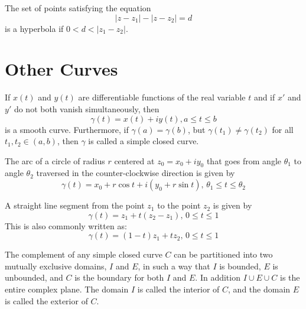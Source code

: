 \documentclass[handout]{ximera}
\begin{document}
\begin{example}[example 7]
The set of points satisfying the equation
\[
|z-z_1| - |z-z_2| = d
\]
is a hyperbola if $0 < d < |z_1 -z_2|$.
\end{example}



\section{Other Curves}


If $x(t)$ and $y(t)$ are differentiable functions of the real variable $t$ and if $x'$ and $y'$ do not both vanish simultaneously,
then
\[
\gamma(t)= x(t) + iy(t),  a \leq t \leq b
\]
is a smooth curve. Furthermore, if $\gamma(a) =\gamma(b)$, but $\gamma(t_1) \neq \gamma(t_2)$ for all $t_1,t_2 \in (a,b)$,
then $\gamma$ is called a simple closed curve.


\begin{example}[example 8]
The arc of a circle of radius $r$ centered at $z_0 = x_0 + iy_0$ that goes from angle $\theta_1$ to angle $\theta_2$ traversed in the counter-clockwise 
direction is given by
\[
\gamma(t) = x_0 + r\cos t + i(y_0 + r\sin t), \, \theta_1 \leq t \leq \theta_2
\]
\end{example}

\begin{example}[example 9]
A straight line segment from the point $z_1$ to the point $z_2$ is given by
\[
\gamma(t) = z_1 + t(z_2-z_1), \, 0 \leq t \leq 1
\]
This is also commonly written as:
\[
\gamma(t) = (1-t)z_1 + tz_2, \, 0 \leq t \leq 1
\]

\begin{image}
\end{image}
\end{example}

\begin{theorem}
The complement of any simple closed curve $C$ can be partitioned into two mutually exclusive domains, $I$ and $E$, in such a way that $I$ is bounded,
$E$ is unbounded, and $C$ is the boundary for both $I$ and $E$. In addition $I \cup E \cup C$ is the entire complex plane.
The domain $I$ is called the interior of $C$, and the domain $E$ is called the exterior of $C$.
\end{theorem}
\end{document}
